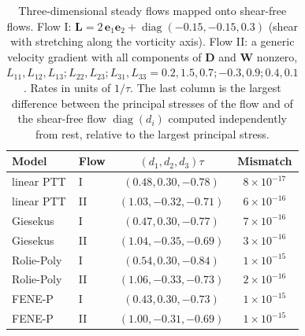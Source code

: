 \begin{table}
\caption{Three-dimensional steady flows mapped onto shear-free flows. Flow I: $\bm L=2\,\bm e_1\bm e_2+\operatorname{diag}(-0.15,-0.15,0.3)$ (shear with stretching along the vorticity axis). Flow II: a generic velocity gradient with all components of $\bm D$ and $\bm W$ nonzero, $L_{11},L_{12},L_{13};L_{22},L_{23};L_{31},L_{33}=0.2,1.5,0.7;-0.3,0.9;0.4,0.1$. Rates in units of $1/\tau$. The last column is the largest difference between the principal stresses of the flow and of the shear-free flow $\operatorname{diag}(d_i)$ computed independently from rest, relative to the largest principal stress.}
\begin{ruledtabular}
\begin{tabular}{llcc}
Model & Flow & $(d_1,d_2,d_3)\tau$ & Mismatch\\
\hline
linear PTT & I & $(0.48,0.30,-0.78)$ & $8\times10^{-17}$ \\
linear PTT & II & $(1.03,-0.32,-0.71)$ & $6\times10^{-16}$ \\
Giesekus & I & $(0.47,0.30,-0.77)$ & $7\times10^{-16}$ \\
Giesekus & II & $(1.04,-0.35,-0.69)$ & $3\times10^{-16}$ \\
Rolie-Poly & I & $(0.54,0.30,-0.84)$ & $1\times10^{-15}$ \\
Rolie-Poly & II & $(1.06,-0.33,-0.73)$ & $2\times10^{-16}$ \\
FENE-P & I & $(0.43,0.30,-0.73)$ & $1\times10^{-15}$ \\
FENE-P & II & $(1.00,-0.31,-0.69)$ & $1\times10^{-15}$ \\
\end{tabular}
\end{ruledtabular}
\end{table}
